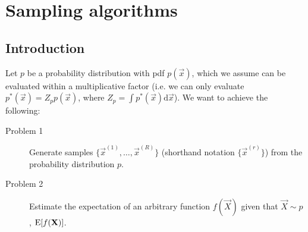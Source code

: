 \chapter{Sampling algorithms}
\section{Introduction}
    Let $p$ be a probability distribution with pdf $p(\vec x)$, which we assume can be evaluated within a multiplicative factor (i.e. we can only evaluate $p^\ast(\vec x) = Z_p p(\vec x)$, where $Z_p = \int p^\ast(\vec x)\mathrm d\vec x$). We want to achieve the following:
    \begin{description}
        \item[Problem 1] Generate samples $\{\vec x^{(1)}, \dotsc, \vec x^{(R)}\}$ (shorthand notation $\{\vec x^{(r)}\}$) from the probability distribution $p$.
        \item[Problem 2] Estimate the expectation of an arbitrary function $f(\vec X)$ given that $\vec X \sim p$, $\operatorname{\mathrm{E}} [f(\boldsymbol{\mathbf{X}})]$. 
    \end{description}



